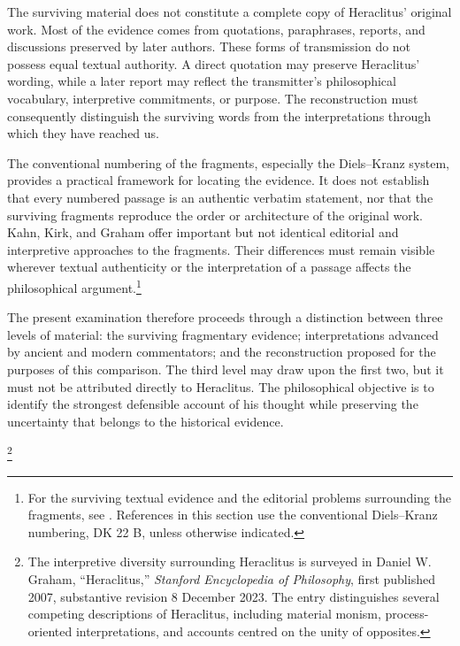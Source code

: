 \label{para:VS.B01.P01.C08.S03.SS01.P002}

The surviving material does not constitute a complete copy of
Heraclitus' original work. Most of the evidence comes from
quotations, paraphrases, reports, and discussions preserved by
later authors. These forms of transmission do not possess equal
textual authority. A direct quotation may preserve Heraclitus'
wording, while a later report may reflect the transmitter's
philosophical vocabulary, interpretive commitments, or purpose.
The reconstruction must consequently distinguish the surviving
words from the interpretations through which they have reached
us.

\label{para:VS.B01.P01.C08.S03.SS01.P003}

{\setlength{\emergencystretch}{2em}%
The conventional numbering of the fragments, especially the
Diels--Kranz system, provides a practical framework for locating
the evidence. It does not establish that every numbered passage
is an authentic verbatim statement, nor that the surviving
fragments reproduce the order or architecture of the original
work. Kahn, Kirk, and Graham offer important but not identical
editorial and interpretive approaches to the fragments. Their
differences must remain visible wherever textual authenticity
or the interpretation of a passage affects the philosophical
argument.\footnote{For the surviving textual evidence and the
editorial problems surrounding the fragments, see
\cite{HeraclitusFragments,KirkHeraclitus1954,
GrahamTextsEarlyGreek2010}. References in this section use
the conventional Diels--Kranz numbering, DK 22 B, unless
otherwise indicated.}%
}

\label{para:VS.B01.P01.C08.S03.SS01.P004}

The present examination therefore proceeds through a distinction
between three levels of material: the surviving fragmentary
evidence; interpretations advanced by ancient and modern
commentators; and the reconstruction proposed for the purposes
of this comparison. The third level may draw upon the first two,
but it must not be attributed directly to Heraclitus. The
philosophical objective is to identify the strongest defensible
account of his thought while preserving the uncertainty that
belongs to the historical evidence.



\footnote{\raggedright
The interpretive diversity surrounding Heraclitus is
surveyed in Daniel W. Graham, ``Heraclitus,'' \textit{Stanford
Encyclopedia of Philosophy}, first published 2007, substantive
revision 8 December 2023. The entry distinguishes several
competing descriptions of Heraclitus, including material
monism, process-oriented interpretations, and accounts
centred on the unity of opposites.}

